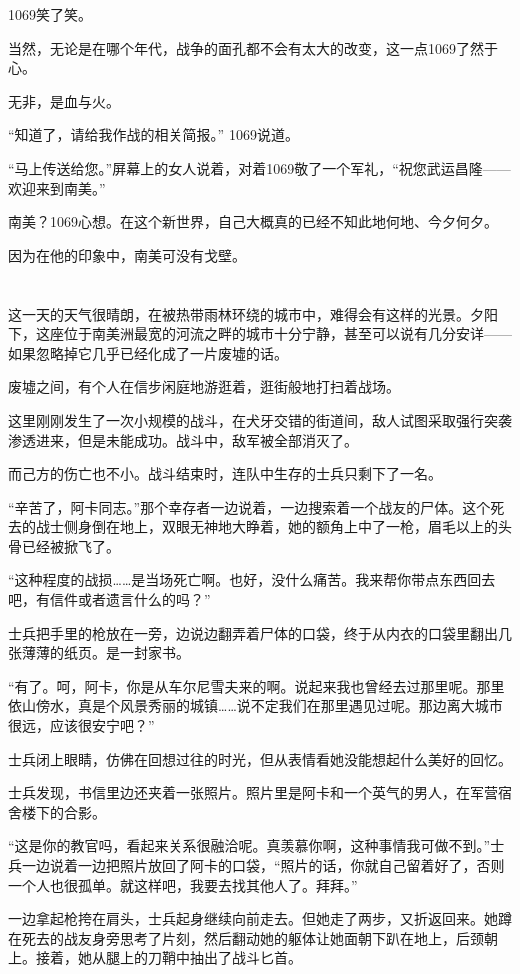 1069笑了笑。

当然，无论是在哪个年代，战争的面孔都不会有太大的改变，这一点1069了然于心。

无非，是血与火。

“知道了，请给我作战的相关简报。” 1069说道。

“马上传送给您。”屏幕上的女人说着，对着1069敬了一个军礼，“祝您武运昌隆——欢迎来到南美。”

南美？1069心想。在这个新世界，自己大概真的已经不知此地何地、今夕何夕。

因为在他的印象中，南美可没有戈壁。

\section*{}

这一天的天气很晴朗，在被热带雨林环绕的城市中，难得会有这样的光景。夕阳下，这座位于南美洲最宽的河流之畔的城市十分宁静，甚至可以说有几分安详——如果忽略掉它几乎已经化成了一片废墟的话。

废墟之间，有个人在信步闲庭地游逛着，逛街般地打扫着战场。

这里刚刚发生了一次小规模的战斗，在犬牙交错的街道间，敌人试图采取强行突袭渗透进来，但是未能成功。战斗中，敌军被全部消灭了。

而己方的伤亡也不小。战斗结束时，连队中生存的士兵只剩下了一名。

“辛苦了，阿卡同志。”那个幸存者一边说着，一边搜索着一个战友的尸体。这个死去的战士侧身倒在地上，双眼无神地大睁着，她的额角上中了一枪，眉毛以上的头骨已经被掀飞了。

“这种程度的战损……是当场死亡啊。也好，没什么痛苦。我来帮你带点东西回去吧，有信件或者遗言什么的吗？”

士兵把手里的枪放在一旁，边说边翻弄着尸体的口袋，终于从内衣的口袋里翻出几张薄薄的纸页。是一封家书。

“有了。呵，阿卡，你是从车尔尼雪夫来的啊。说起来我也曾经去过那里呢。那里依山傍水，真是个风景秀丽的城镇……说不定我们在那里遇见过呢。那边离大城市很远，应该很安宁吧？”

士兵闭上眼睛，仿佛在回想过往的时光，但从表情看她没能想起什么美好的回忆。

士兵发现，书信里边还夹着一张照片。照片里是阿卡和一个英气的男人，在军营宿舍楼下的合影。

“这是你的教官吗，看起来关系很融洽呢。真羡慕你啊，这种事情我可做不到。”士兵一边说着一边把照片放回了阿卡的口袋，“照片的话，你就自己留着好了，否则一个人也很孤单。就这样吧，我要去找其他人了。拜拜。”

一边拿起枪挎在肩头，士兵起身继续向前走去。但她走了两步，又折返回来。她蹲在死去的战友身旁思考了片刻，然后翻动她的躯体让她面朝下趴在地上，后颈朝上。接着，她从腿上的刀鞘中抽出了战斗匕首。

